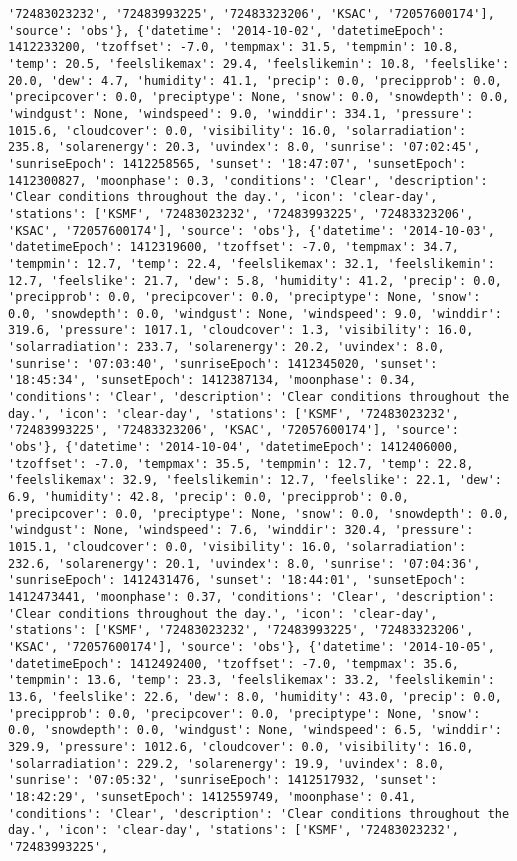 \documentclass[
  letterpaper,
  DIV=11,
  numbers=noendperiod]{scrartcl}
\begin{document}
\begin{verbatim}
'72483023232', '72483993225', '72483323206', 'KSAC', '72057600174'], 'source': 'obs'}, {'datetime': '2014-10-02', 'datetimeEpoch': 1412233200, 'tzoffset': -7.0, 'tempmax': 31.5, 'tempmin': 10.8, 'temp': 20.5, 'feelslikemax': 29.4, 'feelslikemin': 10.8, 'feelslike': 20.0, 'dew': 4.7, 'humidity': 41.1, 'precip': 0.0, 'precipprob': 0.0, 'precipcover': 0.0, 'preciptype': None, 'snow': 0.0, 'snowdepth': 0.0, 'windgust': None, 'windspeed': 9.0, 'winddir': 334.1, 'pressure': 1015.6, 'cloudcover': 0.0, 'visibility': 16.0, 'solarradiation': 235.8, 'solarenergy': 20.3, 'uvindex': 8.0, 'sunrise': '07:02:45', 'sunriseEpoch': 1412258565, 'sunset': '18:47:07', 'sunsetEpoch': 1412300827, 'moonphase': 0.3, 'conditions': 'Clear', 'description': 'Clear conditions throughout the day.', 'icon': 'clear-day', 'stations': ['KSMF', '72483023232', '72483993225', '72483323206', 'KSAC', '72057600174'], 'source': 'obs'}, {'datetime': '2014-10-03', 'datetimeEpoch': 1412319600, 'tzoffset': -7.0, 'tempmax': 34.7, 'tempmin': 12.7, 'temp': 22.4, 'feelslikemax': 32.1, 'feelslikemin': 12.7, 'feelslike': 21.7, 'dew': 5.8, 'humidity': 41.2, 'precip': 0.0, 'precipprob': 0.0, 'precipcover': 0.0, 'preciptype': None, 'snow': 0.0, 'snowdepth': 0.0, 'windgust': None, 'windspeed': 9.0, 'winddir': 319.6, 'pressure': 1017.1, 'cloudcover': 1.3, 'visibility': 16.0, 'solarradiation': 233.7, 'solarenergy': 20.2, 'uvindex': 8.0, 'sunrise': '07:03:40', 'sunriseEpoch': 1412345020, 'sunset': '18:45:34', 'sunsetEpoch': 1412387134, 'moonphase': 0.34, 'conditions': 'Clear', 'description': 'Clear conditions throughout the day.', 'icon': 'clear-day', 'stations': ['KSMF', '72483023232', '72483993225', '72483323206', 'KSAC', '72057600174'], 'source': 'obs'}, {'datetime': '2014-10-04', 'datetimeEpoch': 1412406000, 'tzoffset': -7.0, 'tempmax': 35.5, 'tempmin': 12.7, 'temp': 22.8, 'feelslikemax': 32.9, 'feelslikemin': 12.7, 'feelslike': 22.1, 'dew': 6.9, 'humidity': 42.8, 'precip': 0.0, 'precipprob': 0.0, 'precipcover': 0.0, 'preciptype': None, 'snow': 0.0, 'snowdepth': 0.0, 'windgust': None, 'windspeed': 7.6, 'winddir': 320.4, 'pressure': 1015.1, 'cloudcover': 0.0, 'visibility': 16.0, 'solarradiation': 232.6, 'solarenergy': 20.1, 'uvindex': 8.0, 'sunrise': '07:04:36', 'sunriseEpoch': 1412431476, 'sunset': '18:44:01', 'sunsetEpoch': 1412473441, 'moonphase': 0.37, 'conditions': 'Clear', 'description': 'Clear conditions throughout the day.', 'icon': 'clear-day', 'stations': ['KSMF', '72483023232', '72483993225', '72483323206', 'KSAC', '72057600174'], 'source': 'obs'}, {'datetime': '2014-10-05', 'datetimeEpoch': 1412492400, 'tzoffset': -7.0, 'tempmax': 35.6, 'tempmin': 13.6, 'temp': 23.3, 'feelslikemax': 33.2, 'feelslikemin': 13.6, 'feelslike': 22.6, 'dew': 8.0, 'humidity': 43.0, 'precip': 0.0, 'precipprob': 0.0, 'precipcover': 0.0, 'preciptype': None, 'snow': 0.0, 'snowdepth': 0.0, 'windgust': None, 'windspeed': 6.5, 'winddir': 329.9, 'pressure': 1012.6, 'cloudcover': 0.0, 'visibility': 16.0, 'solarradiation': 229.2, 'solarenergy': 19.9, 'uvindex': 8.0, 'sunrise': '07:05:32', 'sunriseEpoch': 1412517932, 'sunset': '18:42:29', 'sunsetEpoch': 1412559749, 'moonphase': 0.41, 'conditions': 'Clear', 'description': 'Clear conditions throughout the day.', 'icon': 'clear-day', 'stations': ['KSMF', '72483023232', '72483993225', 
\end{verbatim}
\end{document}
